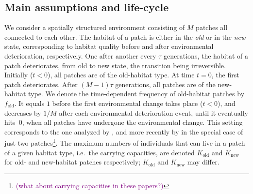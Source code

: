 \documentclass[11pt]{article}
\newcommand{\florence}[1]{\textcolor{purple}{(#1)}} %
\begin{document}
\subsection*{Main assumptions and life-cycle}
We consider a spatially structured environment consisting of $M$ patches all connected to each other. The habitat of a patch is either in the \textit{old} or in the \textit{new} state, corresponding to habitat quality before and after environmental deterioration, respectively. One after another every $\tau$ generations, the habitat of a patch deteriorates, from old to new state, the transition being irreversible. Initially ($t<0$), all patches are of the old-habitat type. At time $t=0$, the first patch deteriorates. After $(M-1)\tau$ generations, all patches are of the new-habitat type. We denote the time-dependent frequency of old-habitat patches by $f_{\text{old}}$. It equals $1$ before the first environmental change takes place ($t<0$), and decreases by $1/M$ after each environmental deterioration event, until it eventually hits~$0$, when all patches have undergone the environmental change. This setting corresponds to the one analyzed by \citet{uecker_2014}, and more recently by \citet{tomasini_2019} in the special case of just two patches\footnote{\florence{what about carrying capacities in these papers?}}. The maximum numbers of individuals that can live in a patch of a given habitat type, i.e.\ the carrying capacities, are denoted $K_{\text{old}}$ and $K_{\text{new}}$ for old- and new-habitat patches respectively; $K_{\text{old}}$ and $K_{\text{new}}$ may differ.
\end{document}

